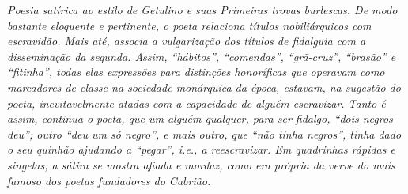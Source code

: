 \begin{didascalia}\itshape
Poesia satírica ao estilo de Getulino e suas \textnormal{Primeiras trovas
burlescas}. De modo bastante eloquente e pertinente, o poeta relaciona
títulos nobiliárquicos com escravidão. Mais até, associa a vulgarização
dos títulos de fidalguia com a disseminação da segunda. Assim,
``hábitos'', ``comendas'', ``grã-cruz'', ``brasão'' e ``fitinha'', todas elas
expressões para distinções honoríficas que operavam como marcadores de
classe na sociedade monárquica da época, estavam, na sugestão do poeta,
inevitavelmente atadas com a capacidade de alguém escravizar. Tanto é
assim, continua o poeta, que um alguém qualquer, para ser fidalgo, ``dois
negros deu''; outro ``deu um só negro'', e mais outro, que ``não tinha
negros'', tinha dado o seu quinhão ajudando a ``pegar'', i.e., a
reescravizar. Em quadrinhas rápidas e singelas, a sátira se mostra
afiada e mordaz, como era própria da verve do mais famoso dos poetas
fundadores do \textnormal{Cabrião}.
\end{didascalia}




